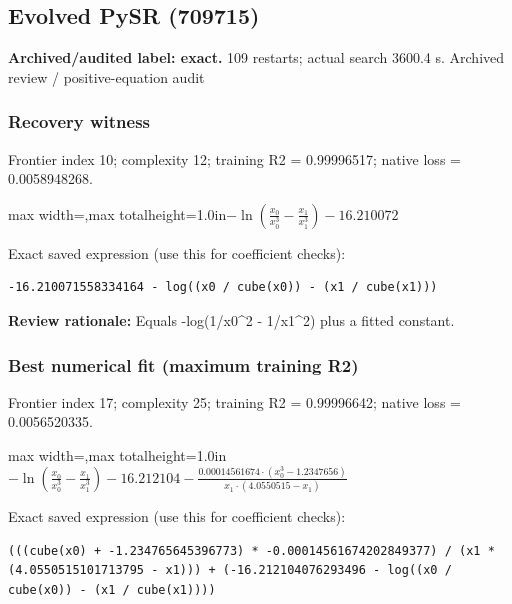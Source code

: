 \documentclass[10pt,letterpaper,landscape]{article}
\begin{document}
\begin{minipage}[t]{0.485\textwidth}
\subsection*{Evolved PySR (709715)}
\textbf{Archived/audited label: exact.} 109 restarts; actual search 3600.4 s.
{\small Archived review / positive-equation audit}
\subsubsection*{Recovery witness}
Frontier index 10; complexity 12; training R2 = 0.99996517; native loss = 0.0058948268.
\begin{center}\begin{adjustbox}{max width=\linewidth,max totalheight=1.0in}$\displaystyle - \ln{\left(\frac{x_{0}}{x_{0}^{3}} - \frac{x_{1}}{x_{1}^{3}} \right)} - 16.210072$\end{adjustbox}\end{center}
{\scriptsize Exact saved expression (use this for coefficient checks):}
\begin{lstlisting}
-16.210071558334164 - log((x0 / cube(x0)) - (x1 / cube(x1)))
\end{lstlisting}
{\small\textbf{Review rationale:} Equals -log(1/x0\textasciicircum{}2 - 1/x1\textasciicircum{}2) plus a fitted constant.}
\subsubsection*{Best numerical fit (maximum training R2)}
Frontier index 17; complexity 25; training R2 = 0.99996642; native loss = 0.0056520335.
\begin{center}\begin{adjustbox}{max width=\linewidth,max totalheight=1.0in}$\displaystyle - \ln{\left(\frac{x_{0}}{x_{0}^{3}} - \frac{x_{1}}{x_{1}^{3}} \right)} - 16.212104 - \frac{0.00014561674 \cdot \left(x_{0}^{3} - 1.2347656\right)}{x_{1} \cdot \left(4.0550515 - x_{1}\right)}$\end{adjustbox}\end{center}
{\scriptsize Exact saved expression (use this for coefficient checks):}
\begin{lstlisting}
(((cube(x0) + -1.234765645396773) * -0.00014561674202849377) / (x1 * (4.0550515101713795 - x1))) + (-16.212104076293496 - log((x0 / cube(x0)) - (x1 / cube(x1))))
\end{lstlisting}
\end{minipage}
\clearpage{}\label{schechter-10000}
\end{document}
